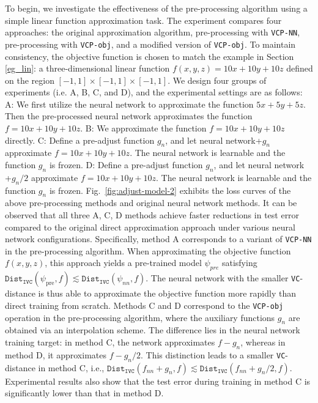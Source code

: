 \documentclass[final]{siamart220329}
\newtheorem{theoretical insights}{Theoretical insights}
\newtheorem{practical takeaway}{Practical takeaway}
\begin{document}
{{{{To begin, we investigate the effectiveness of the pre-processing algorithm using a simple linear function approximation task. The experiment compares four approaches: the original approximation algorithm, pre-processing with \texttt{VCP-NN}, pre-processing with \texttt{VCP-obj}, and a modified version of \texttt{VCP-obj}. To maintain consistency, the objective function is chosen to match the example in Section \ref{eg_lin}: a three-dimensional linear function $f(x,y,z)=10x + 10y + 10z$ defined on the region $[-1, 1]\times[-1, 1]\times[-1, 1]$. 
{We design four groups of experiments (i.e. A, B, C, and D), and the experimental settings are as follows}:  A: We first utilize the neural network to approximate the function $5x+5y+5z$. Then the pre-processed neural network approximates the function $f=10x+10y+10z$. B: We approximate the function $f=10x+10y+10z$ directly. C: Define a pre-adjust function $g_n$, and let neural network+$g_{n}$ approximate $f=10x+10y+10z$. The neural network is learnable and the function $g_n$ is frozen.  D: Define a pre-adjust function $g_n$, and let neural network +$g_n/2$ approximate $f=10x+10y+10z$. The neural network is learnable and the function $g_n$ is frozen. 
Fig.~\ref{fig:adjust-model-2} exhibits the loss curves of the above pre-processing methods and original neural network methods. It can be observed that all three A, C, D methods achieve faster reductions in test error compared to the original direct approximation approach under various neural network configurations. Specifically, method A corresponds to a variant of \texttt{VCP-NN} in the pre-processing algorithm. When approximating the objective function $f(x,y,z)$, this approach yields a pre-trained model $\psi_{pre}$ satisfying $\texttt{Dist}_{\texttt{IVC}}(\psi_{\text{pre}},f)\lesssim\texttt{Dist}_{\texttt{IVC}}(\psi_{nn},f)$. The neural network with the smaller \texttt{VC}-distance is thus able to approximate the objective function more rapidly than direct training from scratch. 
Methods C and D correspond to the \texttt{VCP-obj} operation in the pre-processing algorithm, where the auxiliary functions $g_n$ are obtained via an interpolation scheme. The difference lies in the neural network training target: in method C, the network approximates $f-g_n$, whereas in method D, it approximates $f-g_n/2$. This distinction leads to a smaller \texttt{VC}-distance in method C, i.e., $\texttt{Dist}_{\texttt{IVC}}(f_{nn}+g_n,f)\lesssim\texttt{Dist}_{\texttt{IVC}}(f_{nn}+g_n/2,f)$. Experimental results also show that the test error during training in method C is significantly lower than that in method D.



}}}}
\end{document}
